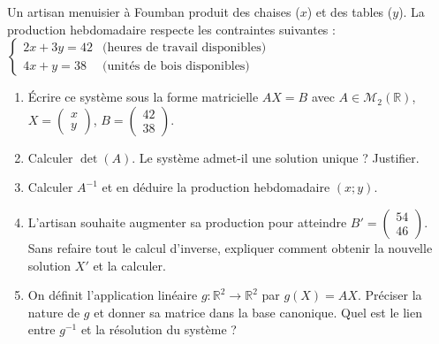 \documentclass[11pt]{article}
\begin{document}
\begin{exercice}
Un artisan menuisier à Foumban produit des chaises ($x$) et des tables ($y$). La production hebdomadaire respecte les contraintes suivantes :
$\begin{cases} 2x + 3y = 42 & \text{(heures de travail disponibles)} \\ 4x + y = 38 & \text{(unités de bois disponibles)} \end{cases}$
\begin{enumerate}
    \item Écrire ce système sous la forme matricielle $A X = B$ avec $A \in \mathcal{M}_2(\mathbb{R})$, $X = \begin{pmatrix} x \\ y \end{pmatrix}$, $B = \begin{pmatrix} 42 \\ 38 \end{pmatrix}$.
    \item Calculer $\det(A)$. Le système admet-il une solution unique ? Justifier.
    \item Calculer $A^{-1}$ et en déduire la production hebdomadaire $(x ; y)$.
    \item L'artisan souhaite augmenter sa production pour atteindre $B' = \begin{pmatrix} 54 \\ 46 \end{pmatrix}$. 
    Sans refaire tout le calcul d'inverse, expliquer comment obtenir la nouvelle solution $X'$ et la calculer.
    \item On définit l'application linéaire $g : \mathbb{R}^2 \to \mathbb{R}^2$ par $g(X) = A X$. Préciser la nature de $g$ et donner sa matrice dans la base canonique. Quel est le lien entre $g^{-1}$ et la résolution du système ?
\end{enumerate}
\end{exercice}
\end{document}
